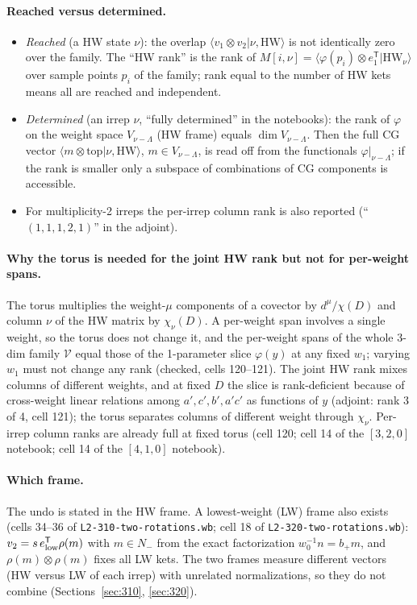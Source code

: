 \documentclass[11pt]{article}
\newcommand{\eT}{e_1^{\mathsf T}}
\newcommand{\nb}[1]{\texttt{#1}}
\begin{document}
\paragraph{Reached versus determined.}
\begin{itemize}
\item \emph{Reached} (a HW state $\nu$): the overlap $\langle v_1\otimes v_2|\nu,\mathrm{HW}\rangle$ is not identically zero over the family. The ``HW rank'' is the rank of $M[i,\nu]=\langle\varphi(p_i)\otimes\eT|\mathrm{HW}_\nu\rangle$ over sample points $p_i$ of the family; rank equal to the number of HW kets means all are reached and independent.
\item \emph{Determined} (an irrep $\nu$, ``fully determined'' in the notebooks): the rank of $\varphi$ on the weight space $V_{\nu-\Lambda}$ (HW frame) equals $\dim V_{\nu-\Lambda}$. Then the full CG vector $\langle m\otimes\mathrm{top}|\nu,\mathrm{HW}\rangle$, $m\in V_{\nu-\Lambda}$, is read off from the functionals $\varphi|_{\nu-\Lambda}$; if the rank is smaller only a subspace of combinations of CG components is accessible.
\item For multiplicity-2 irreps the per-irrep column rank is also reported (``$(1,1,1,2,1)$'' in the adjoint).
\end{itemize}

\paragraph{Why the torus is needed for the joint HW rank but not for per-weight spans.} The torus multiplies the weight-$\mu$ components of a covector by $d^\mu/\chi(D)$ and column $\nu$ of the HW matrix by $\chi_\nu(D)$. A per-weight span involves a single weight, so the torus does not change it, and the per-weight spans of the whole 3-dim family $\mathcal V$ equal those of the 1-parameter slice $\varphi(y)$ at any fixed $w_1$; varying $w_1$ must not change any rank (checked, cells 120--121). The joint HW rank mixes columns of different weights, and at fixed $D$ the slice is rank-deficient because of cross-weight linear relations among $a',c',b',a'c'$ as functions of $y$ (adjoint: rank 3 of 4, cell 121); the torus separates columns of different weight through $\chi_\nu$. Per-irrep column ranks are already full at fixed torus (cell 120; cell 14 of the $[3,2,0]$ notebook; cell 14 of the $[4,1,0]$ notebook).

\paragraph{Which frame.} The undo is stated in the HW frame. A lowest-weight (LW) frame also exists (cells 34--36 of \nb{L2-310-two-rotations.wb}; cell 18 of \nb{L2-320-two-rotations.wb}): $v_2=s\,e_{\rm low}^{\mathsf T}\rho(m)$ with $m\in N_-$ from the exact factorization $w_0^{-1}n=b_+m$, and $\rho(m)\otimes\rho(m)$ fixes all LW kets. The two frames measure different vectors (HW versus LW of each irrep) with unrelated normalizations, so they do not combine (Sections~\ref{sec:310}, \ref{sec:320}).
\end{document}
